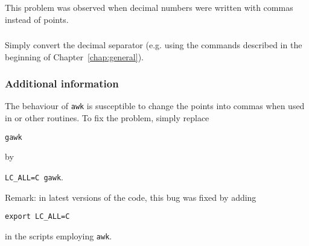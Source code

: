 \subsubsection{\question}


This problem was observed when decimal numbers were written with commas instead of points.


\subsubsection{\answer}

Simply convert the decimal separator (e.g. using the commands described in the beginning of Chapter~\ref{chap:general}).


\subsubsection{Additional information}

The behaviour of \texttt{awk} is susceptible to change the points into commas when used in  or other routines. To fix the problem, simply replace

\texttt{gawk}

by

\texttt{LC\_ALL=C gawk}.

Remark: in latest versions of the code, this bug was fixed by adding 

\texttt{export LC\_ALL=C}

in the scripts employing \texttt{awk}.